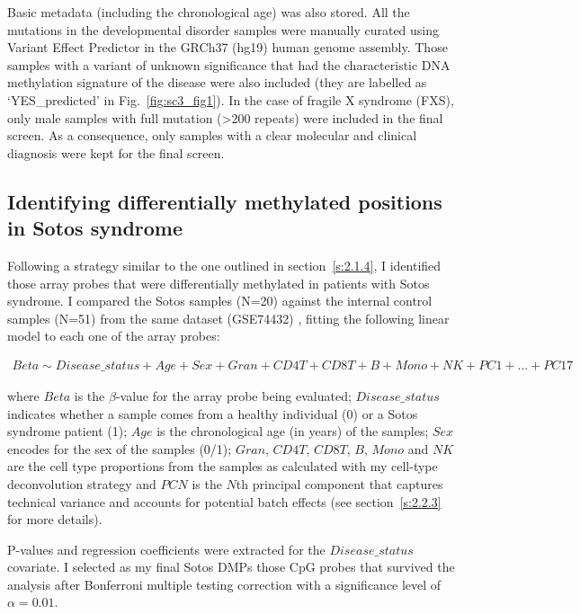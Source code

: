 \bigskip

Basic metadata (including the chronological age) was also stored. All the mutations in the developmental disorder samples were manually curated using Variant Effect Predictor \citep{McLaren2016} in the GRCh37 (\acrshort{hg19}) human genome assembly. Those samples with a variant of unknown significance that had the characteristic DNA methylation signature of the disease were also included (they are labelled as `YES\_predicted' in Fig.~\ref{fig:sc3_fig1}). In the case of fragile X syndrome (\acrshort{FXS}), only male samples with full mutation (>200 repeats) \citep{Schenkel2016} were included in the final screen. As a consequence, only samples with a clear molecular and clinical diagnosis were kept for the final screen.

\subsection*{Identifying differentially methylated positions in Sotos syndrome} 

Following a strategy similar to the one outlined in section~\ref{s:2.1.4}, I identified those array probes that were differentially methylated in patients with Sotos syndrome. I compared the Sotos samples (N=20) against the internal control samples (N=51) from the same dataset (GSE74432) \citep{Choufani2015}, fitting the following linear model to each one of the array probes:

\begin{align} \label{eq:3.1}
Beta \sim Disease\_status + Age + Sex+ Gran + CD4T + CD8T + B + Mono + NK + PC1 + ... + PC17
\end{align} 

where $Beta$ is the $\beta$-value for the array probe being evaluated; $Disease\_status$ indicates whether a sample comes from a healthy individual (0) or a Sotos syndrome patient (1); $Age$ is the chronological age (in years) of the samples; $Sex$ encodes for the sex of the samples (0/1); $Gran$, $CD4T$, $CD8T$, $B$, $Mono$ and $NK$ are the cell type proportions from the samples as calculated with my cell-type deconvolution strategy and $PCN$ is the $N$th principal component that captures technical variance and accounts for potential batch effects (see section~\ref{s:2.2.3} for more details).

\bigskip

P-values and regression coefficients were extracted for the $Disease\_status$ covariate. I selected as my final Sotos DMPs those CpG probes that survived the analysis after Bonferroni multiple testing correction with a significance level of $\alpha=0.01$. 

